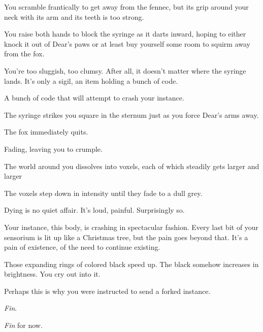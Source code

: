 \null
\vfill

You scramble frantically to get away from the fennec, but its grip around your neck with its arm and its teeth is too strong.

You raise both hands to block the syringe as it darts inward, hoping to either knock it out of Dear's paws or at least buy yourself some room to squirm away from the fox.

You're too sluggish, too clumsy. After all, it doesn't matter where the syringe lands. It's only a sigil, an item holding a bunch of code.

A bunch of code that will attempt to crash your instance.

The syringe strikes you square in the sternum just as you force Dear's arms away.

The fox immediately quits.

Fading, leaving you to crumple.

The world around you dissolves into voxels, each of which steadily gets larger and larger

The voxels step down in intensity until they fade to a dull grey.

\vfill

\newpage

\null
\vfill

Dying is no quiet affair. It's loud, painful. Surprisingly so.

Your instance, this body, is crashing in spectacular fashion. Every last bit of your sensorium is lit up like a Christmas tree, but the pain goes beyond that. It's a pain of existence, of the need to continue existing.

Those expanding rings of colored black speed up. The black somehow increases in brightness. You cry out into it.

Perhaps this is why you were instructed to send a forked instance.

\vfill

\newpage

\null
\vfill

\emph{Fin}.

\vfill

\newpage

\null
\vfill

\emph{Fin} for now.

\vfill

\newpage

\null
\vfill

